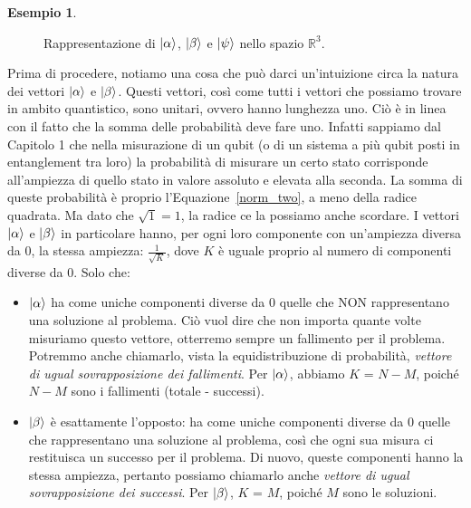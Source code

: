 \documentclass{book}
\theoremstyle{definition}
\theoremstyle{definition}
\theoremstyle{definition}
\newtheorem*{ex}{Esempio}
\theoremstyle{plain}
\theoremstyle{plain}
\theoremstyle{plain}
\theoremstyle{plain}
\begin{document}
\begin{ex}
\begin{figure}[H]
\caption{\scriptsize Rappresentazione di $\ket{\alpha}$, $\ket{\beta}$ e $\ket{\psi}$ nello spazio $\mathbb{R}^3$.}\label{fig:3d_figure_1}
\end{figure}

\end{ex}
Prima di procedere, notiamo una cosa che può darci un'intuizione circa la natura dei vettori $\ket{\alpha}$ e $\ket{\beta}$. Questi vettori, così come tutti i vettori che possiamo trovare in ambito quantistico, sono unitari, ovvero hanno lunghezza uno. Ciò è in linea con il fatto che la somma delle probabilità deve fare uno. 
Infatti sappiamo dal Capitolo 1 che nella misurazione di un qubit (o di un sistema a più qubit posti in entanglement tra loro) la probabilità di misurare un certo stato corrisponde all'ampiezza di quello stato in valore assoluto e elevata alla seconda. La somma di queste probabilità è proprio l'Equazione~\eqref{norm_two}, a meno della radice quadrata. Ma dato che $\sqrt{1} = 1$, la radice ce la possiamo anche scordare. I vettori $\ket{\alpha}$ e $\ket{\beta}$ in particolare hanno, per ogni loro componente con un'ampiezza diversa da 0, la stessa ampiezza: $\frac{1}{\sqrt{K}}$, dove $K$ è uguale proprio al numero di componenti diverse da 0. Solo che:
\begin{itemize}
    \item $\ket{\alpha}$ ha come uniche componenti diverse da 0 quelle che NON rappresentano una soluzione al problema. Ciò vuol dire che non importa quante volte misuriamo questo vettore, otterremo sempre un fallimento per il problema. Potremmo anche chiamarlo, vista la equidistribuzione di probabilità, \emph{vettore di ugual sovrapposizione dei fallimenti}. Per $\ket{\alpha}$, abbiamo $K$ = $N-M$, poiché $N-M$ sono i fallimenti (totale - successi).
    \item $\ket{\beta}$ è esattamente l'opposto: ha come uniche componenti diverse da 0 quelle che rappresentano una soluzione al problema, così che ogni sua misura ci restituisca un successo per il problema. Di nuovo, queste componenti hanno la stessa ampiezza, pertanto possiamo chiamarlo anche \emph{vettore di ugual sovrapposizione dei successi}. Per $\ket{\beta}$, $K$ = $M$, poiché $M$ sono le soluzioni.
\end{itemize}
\end{document}
